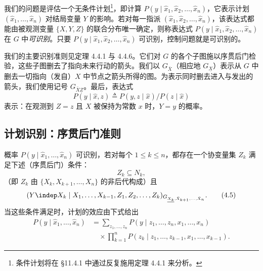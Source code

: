 我们的问题是评估一个无条件计划\footnote{条件计划将在 \S 11.4.1 中通过反复施用定理 4.4.1 来分析。}，即计算 $P(y\mid\hat{x}_1,\hat{x}_2,\dots,\hat{x}_n)$，它表示计划 $(\hat{x}_1,\dots,\hat{x}_n)$ 对结局变量 $Y$ 的影响。若对每一指派 $(\hat{x}_1,\hat{x}_2,\dots,\hat{x}_n)$，该表达式都能由被观测变量 $\{X,Y,Z\}$ 的联合分布唯一确定，则称表达式 $P(y\mid\hat{x}_1,\hat{x}_2,\dots,\hat{x}_n)$ 在 $G$ 中\emph{可识别}。只要 $P(y\mid\hat{x}_1,\hat{x}_2,\dots,\hat{x}_n)$ 可识别，控制问题就是可识别的。

我们的主要识别准则见定理 4.4.1 与 4.4.6。它们对 $G$ 的各个子图施以序贯后门检验，这些子图删去了指向未来行动的箭头。我们以 $G_{\bar{X}}$（相应地 $G_{\underline{X}}$）表示从 $G$ 中删去一切指向（发自）$X$ 中节点之箭头所得的图。为表示同时删去进入与发出的箭头，我们使用记号 $G_{\bar{X}\underline{Z}}$。最后，表达式
\[
P(y\mid\hat{x},z)\triangleq P(y,z\mid\hat{x})\big/P(z\mid\hat{x})
\]
表示：在观测到 $Z=z$ 且 $X$ 被保持为常数 $x$ 时，$Y=y$ 的概率。

\subsection{计划识别：序贯后门准则}

\begin{theorem}
概率 $P(y\mid\hat{x}_1,\dots,\hat{x}_n)$ 可识别，若对每个 $1\le k\le n$，都存在一个协变量集 $Z_k$ 满足下述（序贯后门）条件：
\begin{equation}
Z_k\subseteq N_k, \tag{4.4}
\end{equation}
（即 $Z_k$ 由 $\{X_k,X_{k+1},\dots,X_n\}$ 的非后代构成）且
\begin{equation}
(Y\indep X_k\mid X_1,\dots,X_{k-1},Z_1,Z_2,\dots,Z_k)_{G_{\underline{X_k},\bar{X}_{k+1},\dots,\bar{X}_n}}. \tag{4.5}
\end{equation}
当这些条件满足时，计划的效应由下式给出
\begin{equation}
\begin{aligned}
P(y\mid\hat{x}_1,\dots,\hat{x}_n) &= \sum_{z_1,\dots,z_n}P(y\mid z_1,\dots,z_n,x_1,\dots,x_n)\\
&\quad\times\prod_{k=1}^{n}P(z_k\mid z_1,\dots,z_{k-1},x_1,\dots,x_{k-1}).
\end{aligned}\tag{4.6}
\end{equation}
\end{theorem}

